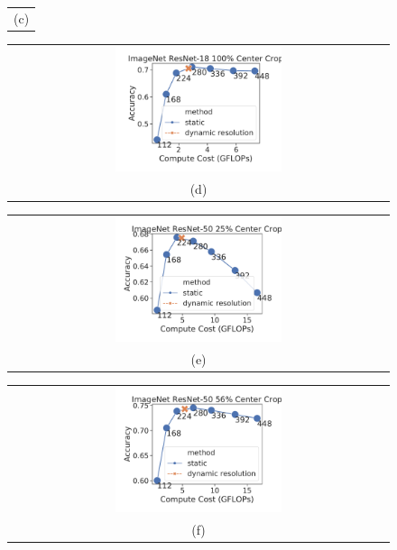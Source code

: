 \begin{figure}[h!]
\begin{tabular}{@{}c@{}}
    \small (c)
    \end{tabular}
    \begin{tabular}{@{}c@{}}
    \includegraphics[width=0.45\textwidth]{e2e_figures/imagenet_resnet18_full_center.pdf} \\
    \small (d)
    \end{tabular}
    \begin{tabular}{@{}c@{}}
    \includegraphics[width=0.45\textwidth]{e2e_figures/imagenet_resnet50_25_center.pdf} \\
    \small (e)
    \end{tabular}
    \begin{tabular}{@{}c@{}}
    \includegraphics[width=0.45\textwidth]{e2e_figures/imagenet_resnet50_56_center.pdf} \\
    \small (f)
    \end{tabular}
    \begin{tabular}{@{}c@{}}

\end{tabular}
\end{figure}
